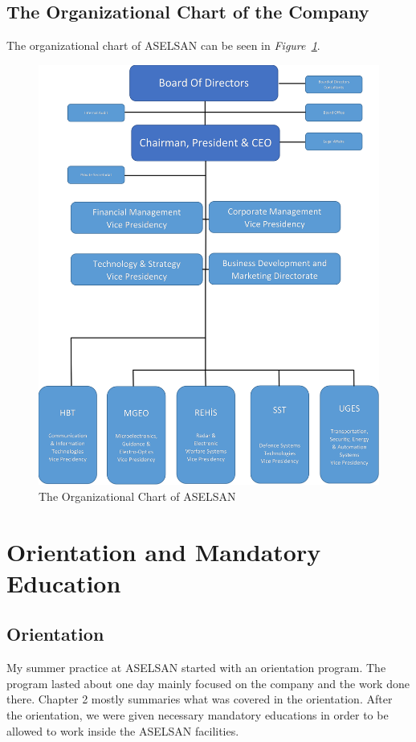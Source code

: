\vfill 

\subsection{The Organizational Chart of the Company}
\-
\indent
The organizational chart of ASELSAN can be seen in \textit{Figure~\ref{fig:orgc}}.

\begin{figure}[H]
\center
\setlength{\unitlength}{\textwidth} 
\includegraphics[width=0.93\unitlength]{organizasyon4}
\caption{\label{fig:orgc}The Organizational Chart of ASELSAN }
\end{figure}

	
	
\vfill

\section{Orientation and Mandatory Education}

\subsection{Orientation}
\- \indent
	My summer practice at ASELSAN started with an orientation program. The program lasted about one day mainly focused on the company and the work done there. Chapter 2 mostly summaries what was covered in the orientation. After the orientation, we were given necessary mandatory educations in order to be allowed to work inside the ASELSAN facilities.  

